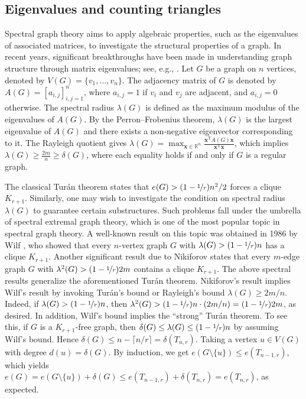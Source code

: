 \documentclass[11pt]{article}
\begin{document}
\subsection{Eigenvalues and counting triangles} 

Spectral graph theory aims to apply algebraic properties, such as the eigenvalues of associated matrices, to investigate the structural properties of a graph. 
In recent years, significant breakthroughs have been made in understanding graph structure through matrix eigenvalues; see, e.g.,   \cite{Huang2019,JTYZZ2021}.  
Let $G$ be a graph on $n$ vertices, denoted by $V(G)=\{v_1,\ldots ,v_n\}$. 
The adjacency matrix of $G$ is denoted by $A(G)=[a_{i,j}]_{i,j=1}^n$, 
where $a_{i,j}=1$ if $v_i$ and $v_j$ are adjacent, and $a_{i,j}=0$ otherwise. 
The spectral radius $\lambda (G)$ is defined as the maximum modulus 
of the eigenvalues of $A(G)$. By the Perron--Frobenius theorem, $\lambda (G)$ is the largest eigenvalue of $A(G)$ and there exists a non-negative eigenvector corresponding to it. The Rayleigh quotient gives 
$\lambda (G)=\max_{\bm{x}\in \mathbb{R}^n} \frac{\bm{x}^{\mathrm{T}}A(G)\bm{x}}{\bm{x}^{\mathrm{T}}\bm{x}}$, which implies $\lambda (G)\ge \frac{2m}{n} \ge \delta (G)$, 
where each equality holds if and only if $G$ is a regular graph. 
 

\medskip 
The classical Tur\'{a}n theorem states that 
$e(G)>(1- \nicefrac{1}{r} )n^2/2$ forces a clique $K_{r+1}$. 
Similarly, one may wish to investigate the condition on spectral radius $\lambda (G)$ to guarantee certain substructures.  
Such problems fall under the umbrella of spectral extremal graph theory, which is one of the most 
popular topic in spectral graph theory. 
A well-known result on this topic was obtained 
in 1986 by Wilf \cite{Wil1986}, who showed that 
every $n$-vertex graph $G$ with 
$\lambda (G) > (1- \nicefrac{1}{r})n$ has  
a clique $K_{r+1}$. 
Another significant result due to Nikiforov \cite{Niki2002cpc} 
states that every $m$-edge graph $G$ with $\lambda^2 (G)>
 {(1- \nicefrac{1}{r})2m}$ contains a clique $K_{r+1}$. 
The above spectral results generalize 
the aforementioned Tur\'{a}n theorem. 
 Nikiforov's result implies Wilf's result 
by invoking Tur\'{a}n's bound or Rayleigh's bound $\lambda (G) \ge 2m/n$. 
Indeed,  if $\lambda (G)> (1- \nicefrac{1}{r})n$, 
then $\lambda^2(G)> (1-\nicefrac{1}{r})n \cdot (2m/n) 
= (1- \nicefrac{1}{r})2m$, as desired. 
In addition, Wilf's bound implies the ``strong'' Tur\'{a}n theorem. To see this, if $G$ is a $K_{r+1}$-free graph, 
then $\delta (G)\le \lambda (G) \le (1- \nicefrac{1}{r})n$ by assuming Wilf's bound. Hence $\delta (G)\le n - \lceil n/r\rceil = \delta (T_{n,r})$. 
Taking a vertex $u\in V(G)$ with degree $d(u) = \delta (G)$.  
By induction, we get $e(G\setminus \{u\}) \le e(T_{n-1,r})$, which yields $e(G)= e(G\setminus \{u\}) + \delta (G)  
\le e(T_{n-1,r}) + \delta (T_{n,r}) = e(T_{n,r})$, as expected.
\end{document}
